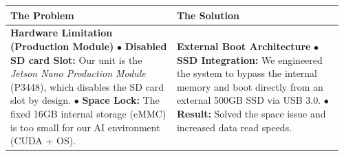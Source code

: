{
	\renewcommand{\arraystretch}{1.5}
	\small
	
	\noindent
	\begin{tabular}{|p{0.48\linewidth}|p{0.48\linewidth}|}
		\hline
		\cellcolor{red!40!black}\textbf{\color{white} The Problem} & 
		\cellcolor{blue!40!black}\textbf{\color{white} The Solution} \\ 
		\hline
		\cellcolor{gray!10}
		\textbf{Hardware Limitation (Production Module)} \newline
		$\bullet$ \textbf{Disabled SD card Slot:} Our unit is the \textit{Jetson Nano Production Module} (P3448), which disables the SD card slot by design. \newline
		$\bullet$ \textbf{Space Lock:} The fixed 16GB internal storage (eMMC) is too small for our AI environment (CUDA + OS).
		& 
		\cellcolor{gray!10}
		\textbf{External Boot Architecture} \newline
		$\bullet$ \textbf{SSD Integration:} We engineered the system to bypass the internal memory and boot directly from an external 500GB SSD via USB 3.0. \newline
		$\bullet$ \textbf{Result:} Solved the space issue and increased data read speeds. \\
		\hline
	\end{tabular}
}
